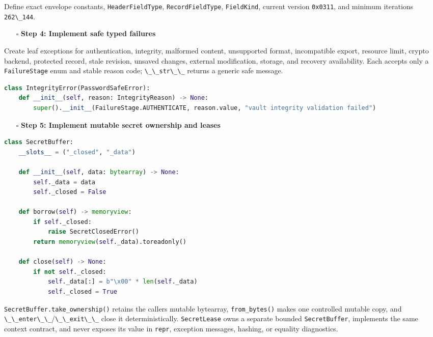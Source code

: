\documentclass[
  letterpaper,
]{article}
\newcommand{\passthrough}[1]{#1}
\providecommand{\tightlist}{%
  \setlength{\itemsep}{0pt}\setlength{\parskip}{0pt}}
\begin{document}
Define exact envelope constants, \nolinkurl{HeaderFieldType}, \nolinkurl{RecordFieldType},
\passthrough{\lstinline!FieldKind!}, current version \passthrough{\lstinline!0x0311!}, and minimum iterations
\passthrough{\lstinline!262\_144!}.

\begin{itemize}
\tightlist
\item[$\square$]
  \textbf{Step 4: Implement safe typed failures}
\end{itemize}

Create leaf exceptions for authentication, integrity, malformed content, unsupported format, incompatible export,
resource limit, crypto backend, protected record, stale revision, unsaved changes, external modification, storage, and
recovery availability. Each accepts only a \nolinkurl{FailureStage} enum and stable reason code;
\passthrough{\lstinline!\_\_str\_\_!} returns a generic safe message.

\begin{lstlisting}[language=Python]
class IntegrityError(PasswordSafeError):
    def __init__(self, reason: IntegrityReason) -> None:
        super().__init__(FailureStage.AUTHENTICATE, reason.value, "vault integrity validation failed")
\end{lstlisting}

\begin{itemize}
\tightlist
\item[$\square$]
  \textbf{Step 5: Implement mutable secret ownership and leases}
\end{itemize}

\begin{lstlisting}[language=Python]
class SecretBuffer:
    __slots__ = ("_closed", "_data")

    def __init__(self, data: bytearray) -> None:
        self._data = data
        self._closed = False

    def borrow(self) -> memoryview:
        if self._closed:
            raise SecretClosedError()
        return memoryview(self._data).toreadonly()

    def close(self) -> None:
        if not self._closed:
            self._data[:] = b"\x00" * len(self._data)
            self._closed = True
\end{lstlisting}

\nolinkurl{SecretBuffer.take_ownership()} retains the caller\textquotesingle s mutable bytearray,
\nolinkurl{from_bytes()} makes one controlled mutable copy, and
\passthrough{\lstinline!\_\_enter\_\_!}/\passthrough{\lstinline!\_\_exit\_\_!} close it deterministically.
\nolinkurl{SecretLease} owns a separate bounded \nolinkurl{SecretBuffer}, implements the same context contract, and
never exposes its value in \passthrough{\lstinline!repr!}, exception messages, hashing, or equality diagnostics.
\end{document}
